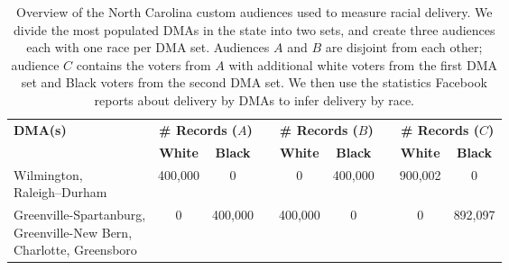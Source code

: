 \begin{table*}
\centering
{}
\begin{tabular}{p{3.75cm}cccccccc}\toprule
\multirow{2}{*}{\bf DMA(s)~\cite{NeilsonDMARegions} } & \multicolumn{2}{c}{\bf \# Records ($A$)} & \phantom{ab} &  \multicolumn{2}{c}{\bf \# Records ($B$) } & \phantom{ab} & \multicolumn{2}{c}{\bf \# Records ($C$) }\\
\cmidrule{2-3} \cmidrule{5-6} \cmidrule{8-9}
 & {\bf White} & {\bf Black} && {\bf White} & {\bf Black} && {\bf White} & {\bf Black} \\
\midrule
\multirow{2}{*}{\parbox{3.75cm}{
Wilmington,\\
Raleigh--Durham\\
}} & \multirow{2}{*}{400,000} & \multirow{2}{*}{0} && \multirow{2}{*}{0} & \multirow{2}{*}{400,000} && \multirow{2}{*}{900,002} & \multirow{2}{*}{0}\\
& & & & & & & & \\
\multirow{2}{*}{\parbox{3.75cm}{
Greenville-Spartanburg,\\
Greenville-New Bern,\\
Charlotte, Greensboro
\\
}} & \multirow{2}{*}{0} & \multirow{2}{*}{400,000} && \multirow{2}{*}{400,000} & \multirow{2}{*}{0} && \multirow{2}{*}{0} & \multirow{2}{*}{892,097}\\
\phantom{ab} & & & & & & & & \\

\bottomrule
\end{tabular}
\label{stats:race}
\caption{Overview of the North Carolina custom audiences used to measure racial delivery.  We divide the most populated DMAs in the state into two sets, and create three audiences each with one race per DMA set.  Audiences $A$ and $B$ are disjoint from each other; audience $C$ contains the voters from $A$ with additional white voters from the first DMA set and Black voters from the second DMA set.   We then use the statistics Facebook reports about delivery by DMAs to infer delivery by race.}\label{stats:race}
\end{table*}

